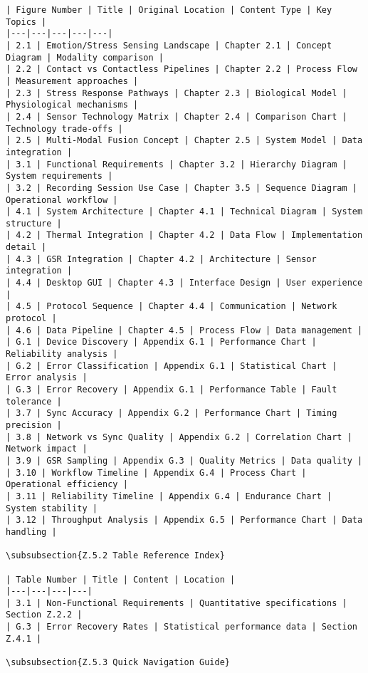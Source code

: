 \begin{verbatim}
| Figure Number | Title | Original Location | Content Type | Key Topics |
|---|---|---|---|---|
| 2.1 | Emotion/Stress Sensing Landscape | Chapter 2.1 | Concept Diagram | Modality comparison |
| 2.2 | Contact vs Contactless Pipelines | Chapter 2.2 | Process Flow | Measurement approaches |
| 2.3 | Stress Response Pathways | Chapter 2.3 | Biological Model | Physiological mechanisms |
| 2.4 | Sensor Technology Matrix | Chapter 2.4 | Comparison Chart | Technology trade-offs |
| 2.5 | Multi-Modal Fusion Concept | Chapter 2.5 | System Model | Data integration |
| 3.1 | Functional Requirements | Chapter 3.2 | Hierarchy Diagram | System requirements |
| 3.2 | Recording Session Use Case | Chapter 3.5 | Sequence Diagram | Operational workflow |
| 4.1 | System Architecture | Chapter 4.1 | Technical Diagram | System structure |
| 4.2 | Thermal Integration | Chapter 4.2 | Data Flow | Implementation detail |
| 4.3 | GSR Integration | Chapter 4.2 | Architecture | Sensor integration |
| 4.4 | Desktop GUI | Chapter 4.3 | Interface Design | User experience |
| 4.5 | Protocol Sequence | Chapter 4.4 | Communication | Network protocol |
| 4.6 | Data Pipeline | Chapter 4.5 | Process Flow | Data management |
| G.1 | Device Discovery | Appendix G.1 | Performance Chart | Reliability analysis |
| G.2 | Error Classification | Appendix G.1 | Statistical Chart | Error analysis |
| G.3 | Error Recovery | Appendix G.1 | Performance Table | Fault tolerance |
| 3.7 | Sync Accuracy | Appendix G.2 | Performance Chart | Timing precision |
| 3.8 | Network vs Sync Quality | Appendix G.2 | Correlation Chart | Network impact |
| 3.9 | GSR Sampling | Appendix G.3 | Quality Metrics | Data quality |
| 3.10 | Workflow Timeline | Appendix G.4 | Process Chart | Operational efficiency |
| 3.11 | Reliability Timeline | Appendix G.4 | Endurance Chart | System stability |
| 3.12 | Throughput Analysis | Appendix G.5 | Performance Chart | Data handling |

\subsubsection{Z.5.2 Table Reference Index}

| Table Number | Title | Content | Location |
|---|---|---|---|
| 3.1 | Non-Functional Requirements | Quantitative specifications | Section Z.2.2 |
| G.3 | Error Recovery Rates | Statistical performance data | Section Z.4.1 |

\subsubsection{Z.5.3 Quick Navigation Guide}


\end{verbatim}
